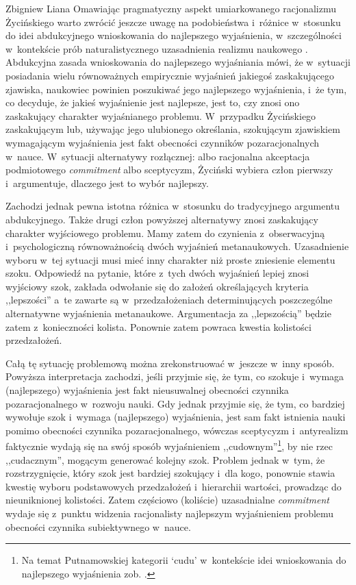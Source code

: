 \begin{artplenv}{Zbigniew Liana}
Omawiając pragmatyczny aspekt umiarkowanego racjonalizmu Życińskiego warto zwrócić jeszcze uwagę na podobieństwa i~różnice w~stosunku do idei abdukcyjnego wnioskowania do najlepszego wyjaśnienia, w~szczególności w~kontekście prób naturalistycznego uzasadnienia realizmu naukowego
\parencites[zob.][s.~102n.265]{grobler_metodologia_2006}[][]{liana_naturalistyczne_2003}. %
 Abdukcyjna zasada wnioskowania do najlepszego wyjaśniania mówi, że w~sytuacji posiadania wielu równoważnych empirycznie wyjaśnień jakiegoś zaskakującego zjawiska, naukowiec powinien poszukiwać jego najlepszego wyjaśnienia, i~że tym, co decyduje, że jakieś wyjaśnienie jest najlepsze, jest to, czy znosi ono zaskakujący charakter wyjaśnianego problemu. W~przypadku Życińskiego zaskakującym lub, używając jego ulubionego określania, szokującym zjawiskiem wymagającym wyjaśnienia jest fakt obecności czynników pozaracjonalnych w~nauce. W~sytuacji alternatywy rozłącznej: albo racjonalna akceptacja podmiotowego \textit{commitment} albo sceptycyzm, Życiński wybiera człon pierwszy i~argumentuje, dlaczego jest to wybór najlepszy.

Zachodzi jednak pewna istotna różnica w~stosunku do tradycyjnego argumentu abdukcyjnego. Także drugi człon powyższej alternatywy znosi zaskakujący charakter wyjściowego problemu. Mamy zatem do czynienia z~obserwacyjną i~psychologiczną równoważnością dwóch wyjaśnień metanaukowych. Uzasadnienie wyboru w~tej sytuacji musi mieć inny charakter niż proste zniesienie elementu szoku. Odpowiedź na pytanie, które z~tych dwóch wyjaśnień lepiej znosi wyjściowy szok, zakłada odwołanie się do założeń określających kryteria ,,lepszości'' a~te zawarte są w~przedzałożeniach determinujących poszczególne alternatywne wyjaśnienia metanaukowe. Argumentacja za ,,lepszością'' będzie zatem z~konieczności kolista. Ponownie zatem powraca kwestia kolistości przedzałożeń.

Całą tę sytuację problemową można zrekonstruować w~jeszcze w~inny sposób. Powyższa interpretacja zachodzi, jeśli przyjmie się, że tym, co szokuje i~wymaga (najlepszego) wyjaśnienia jest fakt nieusuwalnej obecności czynnika pozaracjonalnego w~rozwoju nauki. Gdy jednak przyjmie się, że tym, co bardziej wywołuje szok i~wymaga (najlepszego) wyjaśnienia, jest sam fakt istnienia nauki pomimo obecności czynnika pozaracjonalnego, wówczas sceptycyzm i~antyrealizm faktycznie wydają się na swój sposób wyjaśnieniem ,,cudownym''\footnote{Na temat Putnamowskiej kategorii ‘cudu' w~kontekście idei wnioskowania do najlepszego wyjaśnienia zob.
\parencites[][s.~70n]{psillos_scientific_1999}[][s.~265]{grobler_metodologia_2006}[][s.~133]{liana_naturalistyczne_2003}.%
}, by nie rzec ,,cudacznym'', mogącym generować kolejny szok. Problem jednak w~tym, że rozstrzygnięcie, który szok jest bardziej szokujący i~dla kogo, ponownie stawia kwestię wyboru podstawowych przedzałożeń i~hierarchii wartości, prowadząc do nieuniknionej kolistości. Zatem częściowo (koliście) uzasadnialne \textit{commitment} wydaje się z~punktu widzenia racjonalisty najlepszym wyjaśnieniem problemu obecności czynnika subiektywnego w~nauce.


\end{artplenv}
